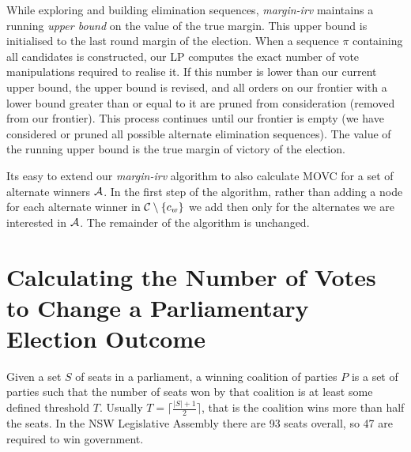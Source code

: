 \documentclass{article}
\newcommand{\pjs}[1]{\marginpar{\sc pjs}{\textcolor{blue}{#1}}}
\begin{document}
While exploring and building elimination sequences, \textit{margin-irv} maintains a running \textit{upper bound} on the value of the true margin. This upper bound is initialised to the last round margin of the election. When a sequence $\pi$ containing all candidates is constructed, our LP computes the exact number of vote manipulations required to realise it. If this number is lower than our current upper bound, the upper bound is revised, and all orders on our frontier with a lower bound greater than or equal to it are pruned from consideration (removed from our frontier). This process continues until our frontier is empty (we have considered or pruned all possible alternate elimination sequences). The value of the running upper bound is the true margin of victory of the election.

Its easy to extend our \textit{margin-irv} algorithm to also calculate MOVC for a set of alternate winners $\mathcal{A}$.  In the first step of the algorithm, rather than adding a node for each alternate winner in $\mathcal{C} \setminus \{c_w\}$ we add then only for the alternates we are interested in $\mathcal{A}$. The remainder of the algorithm is unchanged.



\section{Calculating the Number of Votes to Change a Parliamentary Election Outcome}

Given a set $S$ of seats in a parliament, a winning coalition of parties $P$ 
is a set of parties such that the number of seats won by that coalition is at least some defined 
threshold $T$. Usually $T = \lceil \frac{|S|+1}{2} \rceil$, that is the coalition wins more than half the seats.
In the NSW Legislative Assembly there are 93 seats overall, so 47 are required to win government.
\end{document}
